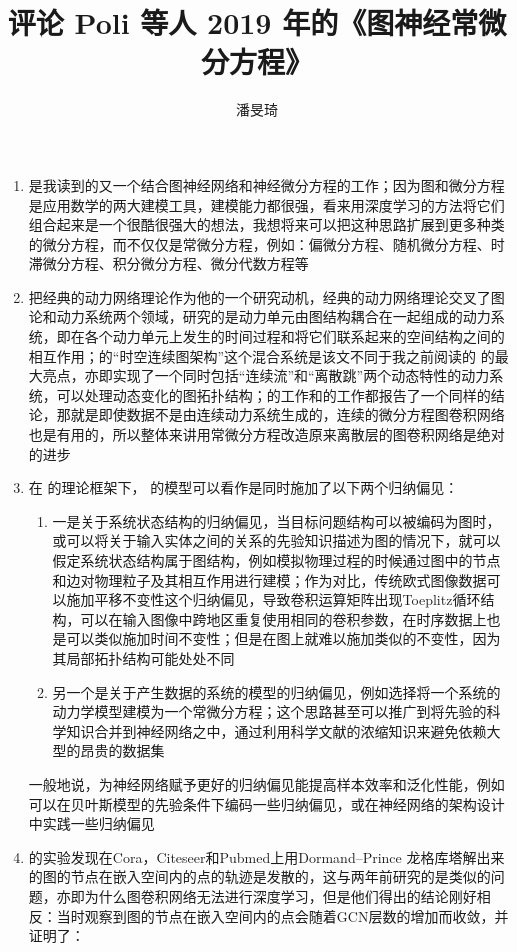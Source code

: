 \documentclass[11pt]{article}
\title{评论 Poli 等人 2019 年的《图神经常微分方程》}
\author{潘旻琦}
\date{\zhtoday}
\begin{document}
\maketitle
\begin{enumerate}
\item \cite{poli2019graph} 是我读到的又一个结合图神经网络和神经微分方程的工作；因为图和微分方程是应用数学的两大建模工具，建模能力都很强，看来用深度学习的方法将它们组合起来是一个很酷很强大的想法，我想将来可以把这种思路扩展到更多种类的微分方程，而不仅仅是常微分方程，例如：偏微分方程、随机微分方程、时滞微分方程、积分微分方程、微分代数方程等
\item \cite{poli2019graph}把经典的动力网络理论作为他的一个研究动机，经典的动力网络理论交叉了图论和动力系统两个领域，研究的是动力单元由图结构耦合在一起组成的动力系统，即在各个动力单元上发生的时间过程和将它们联系起来的空间结构之间的相互作用；\cite{poli2019graph}的``时空连续图架构''这个混合系统是该文不同于我之前阅读的 \cite{zang2019neural} 的最大亮点，亦即实现了一个同时包括``连续流''和``离散跳''两个动态特性的动力系统，可以处理动态变化的图拓扑结构；\cite{zang2019neural}的工作和\cite{poli2019graph}的工作都报告了一个同样的结论，那就是即使数据不是由连续动力系统生成的，连续的微分方程图卷积网络也是有用的，所以整体来讲用常微分方程改造原来离散层的图卷积网络是绝对的进步
\item 在 \cite{battaglia2018relational} 的理论框架下，\cite{poli2019graph} 的模型可以看作是同时施加了以下两个归纳偏见：
\begin{enumerate}
\item 一是关于系统状态结构的归纳偏见，当目标问题结构可以被编码为图时，或可以将关于输入实体之间的关系的先验知识描述为图的情况下，就可以假定系统状态结构属于图结构，例如模拟物理过程的时候通过图中的节点和边对物理粒子及其相互作用进行建模；作为对比，传统欧式图像数据可以施加平移不变性这个归纳偏见，导致卷积运算矩阵出现Toeplitz循环结构，可以在输入图像中跨地区重复使用相同的卷积参数，在时序数据上也是可以类似施加时间不变性；但是在图上就难以施加类似的不变性，因为其局部拓扑结构可能处处不同
\item 另一个是关于产生数据的系统的模型的归纳偏见，例如选择将一个系统的动力学模型建模为一个常微分方程；这个思路甚至可以推广到将先验的科学知识合并到神经网络之中，通过利用科学文献的浓缩知识来避免依赖大型的昂贵的数据集
\end{enumerate}
一般地说，为神经网络赋予更好的归纳偏见能提高样本效率和泛化性能，例如可以在贝叶斯模型的先验条件下编码一些归纳偏见，或在神经网络的架构设计中实践一些归纳偏见
\item \cite{poli2019graph}的实验发现在Cora，Citeseer和Pubmed上用Dormand–Prince 龙格库塔解出来的图的节点在嵌入空间内的点的轨迹是发散的，这与两年前\cite{li2018deeper}研究的是类似的问题，亦即为什么图卷积网络无法进行深度学习，但是他们得出的结论刚好相反：\cite{li2018deeper}当时观察到图的节点在嵌入空间内的点会随着GCN层数的增加而收敛，并证明了：\[
\]
\end{enumerate}
\end{document}
